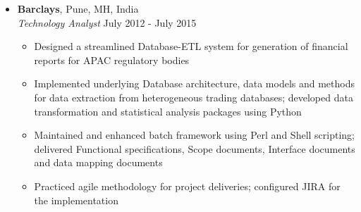 \documentclass[10pt]{article}
\begin{document}
\begin{itemize}[leftmargin=0.15in]
\begin{itemize}
\end{itemize}

\item  {\bfseries Barclays}, Pune, MH, India \\
{\sl Technology Analyst} \hfill July 2012 - July 2015
\vspace{-0.15cm}
\begin{itemize}
\setlength{\itemsep}{0pt}%
\item Designed a streamlined Database-ETL system for generation of financial reports for APAC regulatory bodies
\item Implemented underlying Database architecture, data models and methods for data extraction from heterogeneous trading databases; developed data transformation and statistical analysis packages using Python
\item Maintained and enhanced batch framework using Perl and Shell scripting; delivered Functional specifications, Scope documents, Interface documents and data mapping documents
\item Practiced agile methodology for project deliveries; configured JIRA for the implementation
\end{itemize}
\end{itemize}
\end{document}
